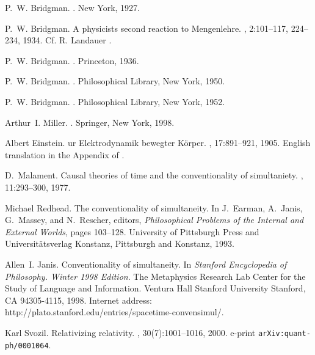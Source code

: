\begin{thebibliography}{10}

P.~W. Bridgman.
.
\newblock New York, 1927.

P.~W. Bridgman.
\newblock A physicists second reaction to {M}engenlehre.
, 2:101--117, 224--234, 1934.
\newblock Cf. R. Landauer \cite{landauer-95}.

P.~W. Bridgman.
.
\newblock Princeton, 1936.

P.~W. Bridgman.
.
\newblock Philosophical Library, New York, 1950.

P.~W. Bridgman.
.
\newblock Philosophical Library, New York, 1952.

Arthur~I. Miller.
.
\newblock Springer, New York, 1998.

Albert Einstein.
ur {E}lektrodynamik bewegter {K}{\"{o}}rper.
, 17:891--921, 1905.
\newblock English translation in the Appendix of \cite{miller-1998}.

D.~Malament.
\newblock Causal theories of time and the conventionality of simultaniety.
, 11:293--300, 1977.

Michael Redhead.
\newblock The conventionality of simultaneity.
\newblock In J.~Earman, A.~Janis, G.~Massey, and N.~Rescher, editors, {\em
  Philosophical Problems of the Internal and External Worlds}, pages 103--128.
  University of Pittsburgh Press and Universit{\"{a}}tsverlag Konstanz,
  Pittsburgh and Konstanz, 1993.

Allen~I. Janis.
\newblock Conventionality of simultaneity.
\newblock In {\em Stanford Encyclopedia of Philosophy. Winter 1998 Edition}.
  The Metaphysics Research Lab Center for the Study of Language and
  Information. Ventura Hall Stanford University Stanford, CA 94305-4115, 1998.
\newblock Internet address:
  http://plato.stanford.edu/entries/spacetime-convensimul/.

Karl Svozil.
\newblock Relativizing relativity.
, 30(7):1001--1016, 2000.
\newblock e-print {\tt arXiv:quant-ph/0001064}.


\end{thebibliography}
